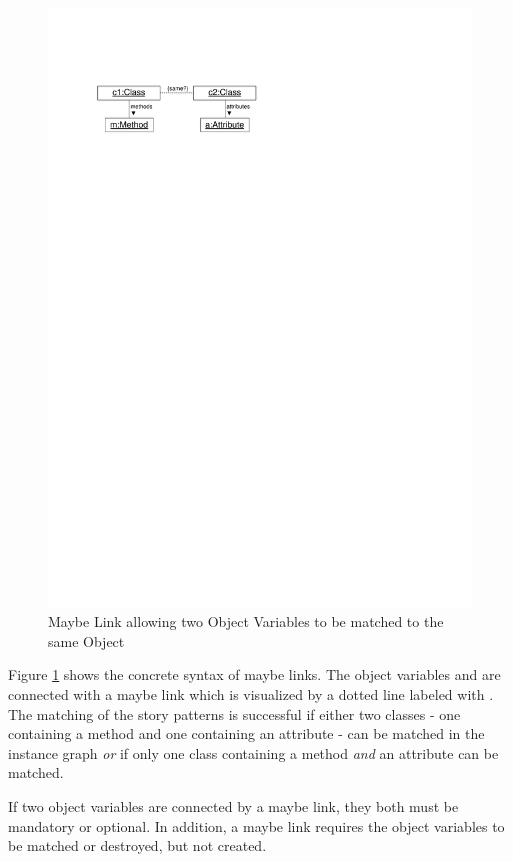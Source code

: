 \begin{figure}[htb]
  \centering
  \includegraphics[scale=.8]{figures/MaybeLink}
  \caption{Maybe Link allowing two Object Variables to be matched to the same Object}
  \label{fig:maybeLink}
\end{figure}

Figure \ref{fig:maybeLink} shows the concrete syntax of maybe links. The object variables  and  are connected with a maybe link which is visualized by a dotted line labeled with .
The matching of the story patterns is successful if either two classes - one containing a method and one containing an attribute - can be matched in the instance graph \emph{or} if only one class containing a method \emph{and} an attribute can be matched.

If two object variables are connected by a maybe link, they both must be mandatory or optional. In addition, a maybe link requires the object variables to be matched or destroyed, but not created.  


